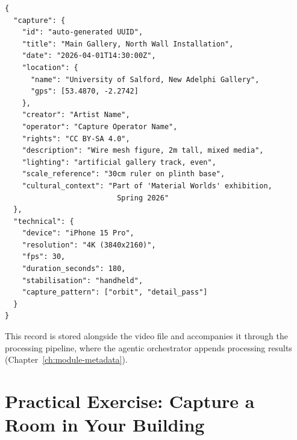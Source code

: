 \begin{lstlisting}[language={}, caption={Capture-time metadata record (JSON).}, label={lst:capture-metadata}]
{
  "capture": {
    "id": "auto-generated UUID",
    "title": "Main Gallery, North Wall Installation",
    "date": "2026-04-01T14:30:00Z",
    "location": {
      "name": "University of Salford, New Adelphi Gallery",
      "gps": [53.4870, -2.2742]
    },
    "creator": "Artist Name",
    "operator": "Capture Operator Name",
    "rights": "CC BY-SA 4.0",
    "description": "Wire mesh figure, 2m tall, mixed media",
    "lighting": "artificial gallery track, even",
    "scale_reference": "30cm ruler on plinth base",
    "cultural_context": "Part of 'Material Worlds' exhibition,
                          Spring 2026"
  },
  "technical": {
    "device": "iPhone 15 Pro",
    "resolution": "4K (3840x2160)",
    "fps": 30,
    "duration_seconds": 180,
    "stabilisation": "handheld",
    "capture_pattern": ["orbit", "detail_pass"]
  }
}
\end{lstlisting}

This record is stored alongside the video file and accompanies it through the processing pipeline, where the agentic orchestrator appends processing results (Chapter~\ref{ch:module-metadata}).

\section{Practical Exercise: Capture a Room in Your Building}
\label{sec:cap-exercise}

